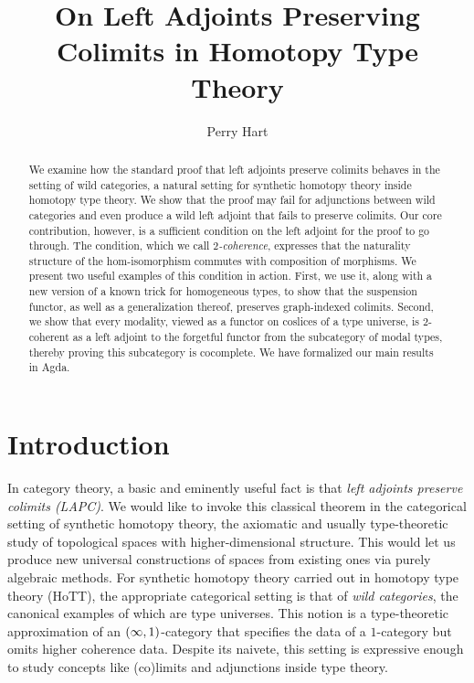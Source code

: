 \documentclass{lmcs}
\theoremstyle{definition}\newtheorem{note}[thm]{Note}
\begin{document}
\title{On Left Adjoints Preserving Colimits in Homotopy Type Theory}

\author[P.~Hart]{Perry Hart}

\address{University of Minnesota, Minneapolis, MN, USA}

\begin{abstract}
We examine how the standard proof that left adjoints preserve colimits behaves in the setting of wild categories, a natural setting for synthetic homotopy theory inside homotopy type theory. We show that the proof may fail for adjunctions between wild categories and even produce a wild left adjoint that fails to preserve colimits. Our core contribution, however, is a sufficient condition on the left adjoint for the proof to go through. The condition, which we call \emph{$2$-coherence}, expresses that the naturality structure of the hom-isomorphism commutes with composition of morphisms. We present two useful examples of this condition in action. First, we use it, along with a new version of a known trick for homogeneous types, to show that the suspension functor, as well as a generalization thereof, preserves graph-indexed colimits. Second, we show that every modality, viewed as a functor on coslices of a type universe, is $2$-coherent as a left adjoint to the forgetful functor from the subcategory of modal types, thereby proving this subcategory is cocomplete. We have formalized our main results in Agda.
\end{abstract}

\maketitle

\section{Introduction}\label{sec:intro} 

In category theory, a basic and eminently useful fact is that \emph{left adjoints preserve colimits (LAPC)}. We would like to invoke this classical theorem in the categorical setting of synthetic homotopy theory, the axiomatic and usually type-theoretic study of topological spaces with higher-dimensional structure. This would let us produce new universal constructions of spaces from existing ones via purely algebraic methods. For synthetic homotopy theory carried out in homotopy type theory (HoTT), the appropriate categorical setting is that of \emph{wild categories}, the canonical examples of which are type universes. This notion is a type-theoretic approximation of an $\mleft(\infty,1\mright)$-category that specifies the data of a $1$-category but omits higher coherence data. Despite its naivete, this setting is expressive enough to study concepts like (co)limits and adjunctions inside type theory. 
\end{document}

